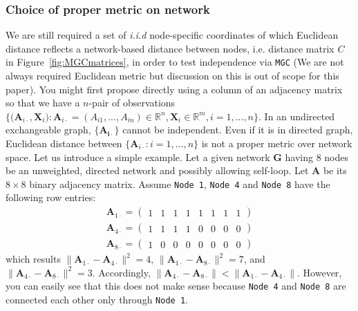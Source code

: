 \documentclass[12pt]{article}
\theoremstyle{definition}
\begin{document}
	
		
\subsubsection{Choice of proper metric on network}

We are still required a set of \textit{i.i.d} node-specific coordinates of which Euclidean distance reflects a network-based distance between nodes, i.e. distance matrix $C$ in Figure~\ref{fig:MGCmatrices}, in order to test independence via \texttt{MGC} (We are not always required Euclidean metric \citep{lyons2013distance} but discussion on this is out of scope for this paper). You might first propose directly using a column of an adjacency matrix so that we have a $n$-pair of observations $\big\{ \big( \mathbf{A}_{i \cdot} , \mathbf{X}_{i} \big) : \mathbf{A}_{i \cdot} = (A_{i 1} , ... , A_{i n} ) \in \mathbb{R}^{n}, \mathbf{X}_{i} \in \mathbb{R}^{m}, i=1,...,n  \big\}.$ In an undirected exchangeable graph, $\{ \mathbf{A_{i \cdot}}  \}$ cannot be independent. Even if it is in directed graph, Euclidean distance between $\{ \mathbf{A}_{i \cdot} : i =1, ... , n \}$ is not a proper metric over network space. Let us introduce a simple example. Let a given network $\mathbf{G}$ having 8 nodes be an unweighted, directed network and possibly allowing self-loop. Let $\mathbf{A}$ be its $8 \times 8$ binary adjacency matrix. Assume \texttt{Node 1}, \texttt{Node 4} and \texttt{Node 8} have the following row entries:	
\begin{equation}
	\begin{gathered}
	\mathbf{A}_{1 \cdot} = \left( \begin{array}{rrrrrrrr} 1 & 1 & 1 & 1 & 1 & 1 & 1 & 1 \end{array} \right) \\
	\mathbf{A}_{4 \cdot} = \left( \begin{array}{rrrrrrrr} 1 & 1 & 1 & 1 & 0 & 0 & 0 & 0 \end{array} \right) \\
	\mathbf{A}_{8 \cdot} = \left( \begin{array}{rrrrrrrr} 1 & 0 & 0 & 0 & 0 & 0 & 0 & 0 \end{array} \right)
	\end{gathered}
\end{equation}
which results $\parallel \mathbf{A}_{1 \cdot} -\mathbf{A}_{4 \cdot} \parallel^2 = 4$,  $\parallel \mathbf{A}_{1 \cdot} -\mathbf{A}_{8 \cdot} \parallel^2 = 7$, and $\parallel \mathbf{A}_{4 \cdot} -\mathbf{A}_{8 \cdot} \parallel^2 = 3.$ Accordingly, $\parallel \mathbf{A}_{4 \cdot} -\mathbf{A}_{8 \cdot} \parallel  < \parallel \mathbf{A}_{1 \cdot} -\mathbf{A}_{4 \cdot} \parallel$. However, you can easily see that this does not make sense because \texttt{Node 4} and \texttt{Node 8} are connected each other only through \texttt{Node 1}. 
\end{document}
